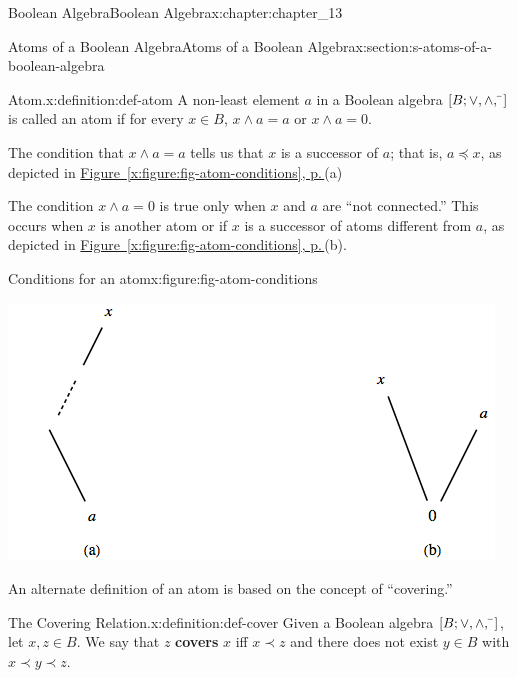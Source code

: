 \documentclass[twoside,10pt,]{book}
\newcommand{\xreffont}{\relax}
\newcommand{\terminology}[1]{\textbf{#1}}
\numberwithin{equation}{section}
\begin{document}
\begin{chapterptx}{Boolean Algebra}{}{Boolean Algebra}{}{}{x:chapter:chapter_13}
\begin{sectionptx}{Atoms of a Boolean Algebra}{}{Atoms of a Boolean Algebra}{}{}{x:section:s-atoms-of-a-boolean-algebra}
\begin{definition}{Atom.}{x:definition:def-atom}%
%
A non-least element \(a\) in a Boolean algebra  \([B; \lor , \land, \bar{}\hspace{3 pt}]\) is called an atom if for every \(x \in  B\),  \(x \land  a = a\) or \(x \land  a = 0\).%
\end{definition}
The condition that \(x \land  a = a\) tells us that \(x\) is a successor of \(a\); that is, \(a \preceq  x\), as depicted in \hyperref[x:figure:fig-atom-conditions]{Figure~{\xreffont\ref{x:figure:fig-atom-conditions}}, p.\,\pageref{x:figure:fig-atom-conditions}}(a)%
\par
The condition \(x \land  a = 0\) is true only when \(x\) and \(a\) are ``not connected.'' This occurs when \(x\) is another atom or if \(x\) is a successor of atoms different from \(a\), as depicted in  \hyperref[x:figure:fig-atom-conditions]{Figure~{\xreffont\ref{x:figure:fig-atom-conditions}}, p.\,\pageref{x:figure:fig-atom-conditions}}(b).%
\begin{figureptx}{Conditions for an atom}{x:figure:fig-atom-conditions}{}%
\begin{image}{0.15}{0.7}{0.15}%
\includegraphics[width=\linewidth]{images/fig-atom-conditions.png}
\end{image}%
\tcblower
\end{figureptx}%
An alternate definition of an atom is based on the concept of ``covering.''%
\begin{definition}{The Covering Relation.}{x:definition:def-cover}%
%
Given a Boolean algebra \([B; \lor , \land, \bar{}\hspace{3 pt}]\), let \(x, z \in B\).  We say that  \(z\) \terminology{covers} \(x\) iff \(x \prec z\) and there does not exist \(y \in B\) with \(x  \prec y  \prec z\).%
\end{definition}

\end{sectionptx}
\end{chapterptx}
\end{document}
